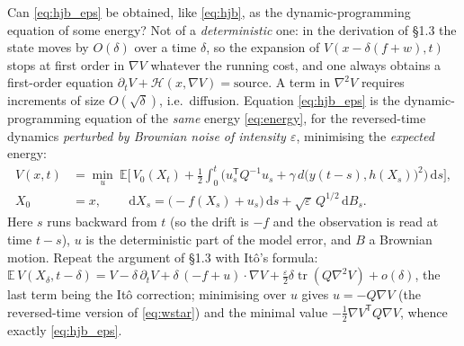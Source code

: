 \documentclass[11pt,a4paper]{article}
\newcommand{\dd}{\,\mathrm{d}}
\newcommand{\tr}{\operatorname{tr}}
\newcommand{\T}{^{\mathsf T}}
\newcommand{\eps}{\varepsilon}
\newcommand{\grad}{\nabla}
\theoremstyle{plain}
\theoremstyle{definition}
\theoremstyle{remark}
\begin{document}
Can \eqref{eq:hjb_eps} be obtained, like \eqref{eq:hjb}, as the dynamic-programming equation of some energy? Not of a \emph{deterministic} one: in the derivation of \S1.3 the state moves by $O(\delta)$ over a time $\delta$, so the expansion of $V(x-\delta(f+w),t)$ stops at first order in $\grad V$ whatever the running cost, and one always obtains a first-order equation $\partial_tV + \mathcal H(x,\grad V)=\text{source}$. A term in $\grad^2V$ requires increments of size $O(\sqrt\delta)$, i.e.\ diffusion. Equation \eqref{eq:hjb_eps} is the dynamic-programming equation of the \emph{same} energy \eqref{eq:energy}, for the reversed-time dynamics \emph{perturbed by Brownian noise of intensity $\eps$}, minimising the \emph{expected} energy:
\begin{equation}
\begin{aligned}
  V(x,t) &= \min_{u}\ \mathbb E\Big[\, V_0(X_t) + \frac12\int_0^t\big( u_s\T Q^{-1}u_s + \gamma\, d\big(y(t-s),h(X_s)\big)^2\big)\dd s \Big],\\
  X_0 &= x,\qquad \dd X_s = \big(-f(X_s)+u_s\big)\dd s + \sqrt{\eps}\,Q^{1/2}\dd B_s .
\end{aligned}
\label{eq:stoch_control}
\end{equation}
Here $s$ runs backward from $t$ (so the drift is $-f$ and the observation is read at time $t-s$), $u$ is the deterministic part of the model error, and $B$ a Brownian motion. Repeat the argument of \S1.3 with It\^o's formula: $\mathbb E\,V(X_\delta,t-\delta) = V - \delta\,\partial_tV + \delta\,(-f+u)\cdot\grad V + \tfrac{\eps}{2}\delta\tr(Q\grad^2V) + o(\delta)$, the last term being the It\^o correction; minimising over $u$ gives $u=-Q\grad V$ (the reversed-time version of \eqref{eq:wstar}) and the minimal value $-\tfrac12\grad V\T Q\grad V$, whence exactly \eqref{eq:hjb_eps}.
\end{document}
